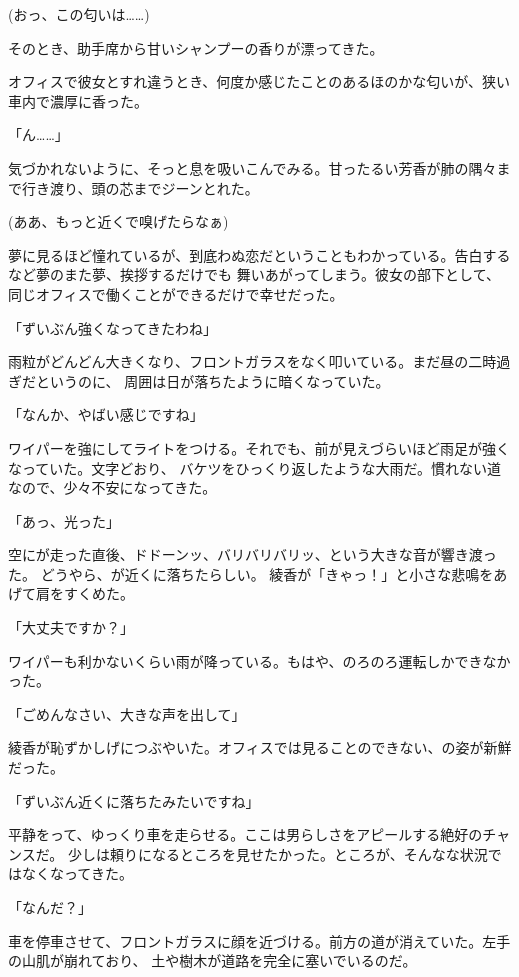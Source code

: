 ﻿\documentclass[
    book,tate,
    line_length=30zw,
    jafontsize=12pt,
    paper=b5j,
    landscape,
    ]{jlreq}
\begin{document}
(おっ、この匂いは……)

そのとき、助手席から甘いシャンプーの香りが漂ってきた。

オフィスで彼女とすれ違うとき、何度か感じたことのあるほのかな匂いが、狭い車内で濃厚に香った。

「ん……」

気づかれないように、そっと息を吸いこんでみる。甘ったるい芳香が肺の隅々まで行き渡り、頭の芯までジーンとれた。

(ああ、もっと近くで嗅げたらなぁ)

夢に見るほど憧れているが、到底わぬ恋だということもわかっている。告白するなど夢のまた夢、挨拶するだけでも
舞いあがってしまう。彼女の部下として、同じオフィスで働くことができるだけで幸せだった。

「ずいぶん強くなってきたわね」

雨粒がどんどん大きくなり、フロントガラスをなく叩いている。まだ昼の二時過ぎだというのに、
周囲は日が落ちたように暗くなっていた。

「なんか、やばい感じですね」

ワイパーを強にしてライトをつける。それでも、前が見えづらいほど雨足が強くなっていた。文字どおり、
バケツをひっくり返したような大雨だ。慣れない道なので、少々不安になってきた。

「あっ、光った」

空にが走った直後、ドドーンッ、バリバリバリッ、という大きな音が響き渡った。
どうやら、が近くに落ちたらしい。
綾香が「きゃっ！」と小さな悲鳴をあげて肩をすくめた。

「大丈夫ですか？」

ワイパーも利かないくらい雨が降っている。もはや、のろのろ運転しかできなかった。

「ごめんなさい、大きな声を出して」

綾香が恥ずかしげにつぶやいた。オフィスでは見ることのできない、の姿が新鮮だった。

「ずいぶん近くに落ちたみたいですね」

平静をって、ゆっくり車を走らせる。ここは男らしさをアピールする絶好のチャンスだ。
少しは頼りになるところを見せたかった。ところが、そんなな状況ではなくなってきた。

「なんだ？」

車を停車させて、フロントガラスに顔を近づける。前方の道が消えていた。左手の山肌が崩れており、
土や樹木が道路を完全に塞いでいるのだ。
\end{document}
